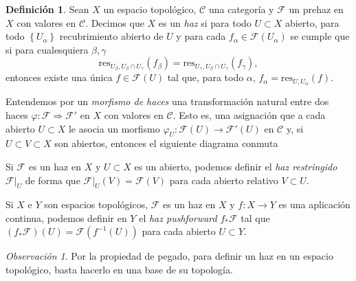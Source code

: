 \documentclass[12pt,a4paper]{article}
\theoremstyle{definition} \newtheorem{defn}[thm]{Definición}
\theoremstyle{definition} \newtheorem{ejemplo}[thm]{Ejemplo}
\theoremstyle{definition} \newtheorem{ejercicio}[thm]{Ejercicio}
\theoremstyle{remark} \newtheorem*{obs}{Observación}
\def\CC{\mathscr{C}}
\def\FF{\mathscr{F}}
\def\res{\mathrm{res}}
\begin{document}
	\begin{defn}
	  Sean $X$ un espacio topológico, $\CC$ una categoría y $\FF$ un prehaz en $X$ con valores en $\CC$. Decimos que $X$ es un \emph{haz} si para todo $U\subset X$ abierto, para todo $\left\{ U_{\alpha} \right\}$ recubrimiento abierto de $U$ y para cada $f_{\alpha}\in \FF(U_{\alpha})$ se cumple que si para cualesquiera $\beta,\gamma$
	  \begin{equation*}
	    \res_{U_{\beta},U_{\beta}\cap U_{\gamma}}(f_{\beta})=\res_{U_{\gamma},U_{\beta}\cap U_{\gamma}}(f_{\gamma}),
	  \end{equation*}
	  entonces existe una única $f\in \FF(U)$ tal que, para todo $\alpha$, $f_{\alpha}=\res_{U,U_{\alpha}}(f)$.

	  Entendemos por un \emph{morfismo de haces} una transformación natural entre dos haces $\varphi:\FF\Rightarrow \FF'$ en $X$ con valores en $\CC$. Esto es, una asignación que a cada abierto $U\subset X$ le asocia un morfismo $\varphi_U:\FF(U) \rightarrow \FF'(U)$ en $\CC$ y, si $U\subset V \subset X$ son abiertos, entonces el siguiente diagrama conmuta
	  \begin{center}
	   \end{center}

	  Si $\FF$ es un haz en $X$ y $U\subset X$ es un abierto, podemos definir el \emph{haz restringido} $\FF|_{U}$ de forma que $\FF|_{U}(V)=\FF(V)$ para cada abierto relativo $V\subset U$.

	  Si $X$ e $Y$ son espacios topológicos, $\FF$ es un haz en $X$ y $f:X\rightarrow Y$ es una aplicación continua, podemos definir en $Y$ el \emph{haz pushforward} $f_*\FF$ tal que $(f_*\FF) (U)=\FF(f^{-1}\left( U \right))$ para cada abierto $U\subset Y$.
	\end{defn}

	\begin{obs}
	  Por la propiedad de pegado, para definir un haz en un espacio topológico, basta hacerlo en una base de su topología.
	\end{obs}
\end{document}
